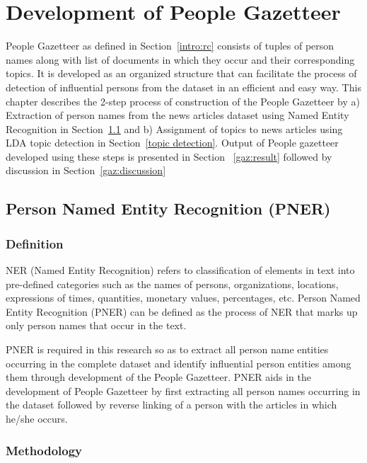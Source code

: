 \chapter{Development of People Gazetteer}
\label{chapter:people gazetteer}

People Gazetteer as defined in Section~\ref{intro:rc} consists of tuples of person names along with list of documents in which they occur and their corresponding topics. It is developed as an organized structure that can facilitate the process of detection of influential persons from the dataset in an efficient and easy way. This chapter describes the 2-step process of construction of the People Gazetteer by
a) Extraction of person names from the news articles dataset using Named Entity Recognition in  Section~\ref{ner} and
b) Assignment of topics to news articles using LDA topic detection in  Section~\ref{topic detection}.
Output of People gazetteer developed using these steps is presented in Section ~\ref{gaz:result} followed by discussion in Section~\ref{gaz:discussion}

\section{Person Named Entity Recognition (PNER)}
\label{ner}


\subsection{Definition}
NER (Named Entity Recognition) refers to classification of elements in text into pre-defined categories such as the names of persons, organizations, locations, expressions of times, quantities, monetary values, percentages, etc. 
Person Named Entity Recognition (PNER) can be defined as the process of NER that marks up only person names that occur in the text.

PNER is required in this research so as to extract all person name entities occurring in the complete dataset and identify influential person entities among them through development of the People Gazetteer. 
PNER aids in the development of People Gazetteer by first extracting all person names occurring in the dataset followed by reverse linking of a person with the articles in which he/she occurs.

\subsection{Methodology}

